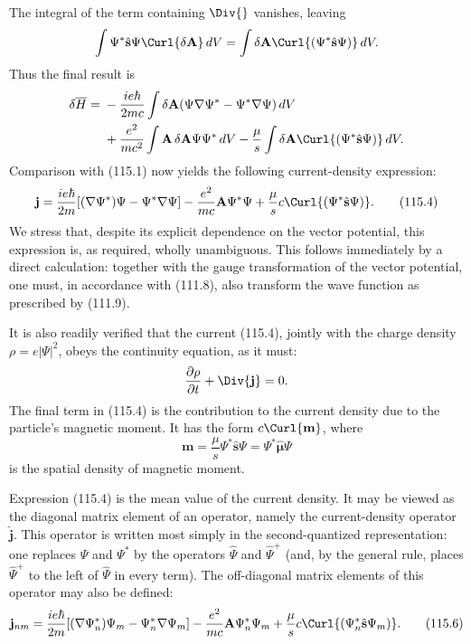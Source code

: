 The integral of the term containing $\Div{}$ vanishes, leaving
\[
 \int\Psi^*\hat{\mathbf s}\Psi\Curl{\delta\mathbf A}\,dV
 =\int\delta\mathbf A\Curl{(\Psi^*\hat{\mathbf s}\Psi)}\,dV.
\]
Thus the final result is
\begin{align*}
 \delta\overline H={}&-\frac{ie\hbar}{2mc}\int\delta\mathbf A
 (\Psi\nabla\Psi^*-\Psi^*\nabla\Psi)\,dV\\
 &+\frac{e^2}{mc^2}\int\mathbf A\,\delta\mathbf A\Psi\Psi^*\,dV
 -\frac\mu s\int\delta\mathbf A\Curl{(\Psi^*\hat{\mathbf s}\Psi)}\,dV.
\end{align*}
Comparison with (115.1) now yields the following current-density expression:
\begin{equation}
 \mathbf j=\frac{ie\hbar}{2m}
 [ (\nabla\Psi^*)\Psi-\Psi^*\nabla\Psi]
 -\frac{e^2}{mc}\mathbf A\Psi^*\Psi
 +\frac\mu s c\Curl{(\Psi^*\hat{\mathbf s}\Psi)}.
 \tag{115.4}
\end{equation}
We stress that, despite its explicit dependence on the vector potential, this
expression is, as required, wholly unambiguous. This follows immediately by a
direct calculation: together with the gauge transformation of the vector
potential, one must, in accordance with (111.8), also transform the wave
function as prescribed by (111.9).

It is also readily verified that the current (115.4), jointly with the charge
density $\rho=e|\Psi|^2$, obeys the continuity equation, as it must:
\[
 \frac{\partial\rho}{\partial t}+\Div{\mathbf j}=0.
\]
The final term in (115.4) is the contribution to the current density due to the
particle's magnetic moment. It has the form $c\Curl{\mathbf m}$, where
\begin{equation}
 \mathbf m=\frac\mu s\Psi^*\hat{\mathbf s}\Psi
 =\Psi^*\hat{\boldsymbol\mu}\Psi
 \tag{115.5}
\end{equation}
is the spatial density of magnetic moment.

Expression (115.4) is the mean value of the current density. It may be viewed
as the diagonal matrix element of an operator, namely the current-density
operator $\hat{\mathbf j}$. This operator is written most simply in the
second-quantized representation: one replaces $\Psi$ and $\Psi^*$ by the
operators $\hat\Psi$ and $\hat\Psi^+$ (and, by the general rule, places
$\hat\Psi^+$ to the left of $\hat\Psi$ in every term). The off-diagonal matrix
elements of this operator may also be defined:
\begin{equation}
 \mathbf j_{nm}=\frac{ie\hbar}{2m}
 [ (\nabla\Psi_n^*)\Psi_m-\Psi_n^*\nabla\Psi_m]
 -\frac{e^2}{mc}\mathbf A\Psi_n^*\Psi_m
 +\frac\mu s c\Curl{(\Psi_n^*\hat{\mathbf s}\Psi_m)}.
 \tag{115.6}
\end{equation}
